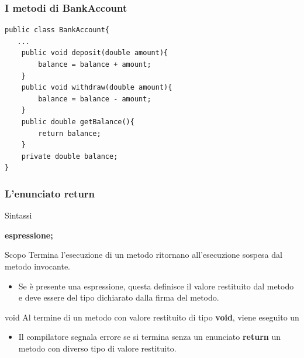 \begin{frame}[fragile]
\frametitle{I metodi di BankAccount}
\begin{lstlisting}
public class BankAccount{ 
   ...
    public void deposit(double amount){ 
        balance = balance + amount;
    }
    public void withdraw(double amount){ 
        balance = balance - amount;
    }
    public double getBalance(){
        return balance;
    }
    private double balance;
}
\end{lstlisting}
\end{frame}

\begin{frame}
\frametitle{L'enunciato return}
\begin{block}{Sintassi}
\begin{center}
\textbf{ espressione;}
\end{center}
\end{block}
\begin{block}{Scopo}\footnotesize
Termina l'esecuzione di un metodo ritornano all'esecuzione sospesa dal metodo invocante.
\begin{itemize}
\item Se è presente una espressione, questa definisce il valore restituito dal metodo e deve essere del tipo 
dichiarato dalla firma del metodo.
\end{itemize}
\end{block}
\begin{block}{void}\footnotesize
Al termine di un metodo con valore restituito di tipo \textbf{void}, viene eseguito un 
\begin{itemize}
\item Il compilatore segnala \alert{errore} se si termina senza un enunciato \textbf{return} un metodo con diverso tipo 
di valore restituito.
\end{itemize}
\end{block}
\end{frame}


